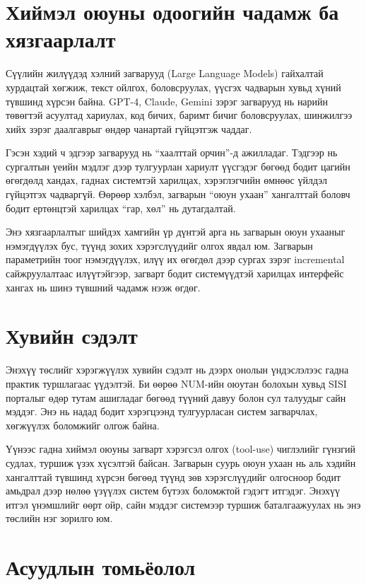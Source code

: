 \section{Хиймэл оюуны одоогийн чадамж ба хязгаарлалт}

Сүүлийн жилүүдэд хэлний загварууд (Large Language Models) гайхалтай хурдацтай хөгжиж, текст ойлгох, боловсруулах, үүсгэх чадварын хувьд хүний түвшинд хүрсэн байна. GPT-4, Claude, Gemini зэрэг загварууд нь нарийн төвөгтэй асуултад хариулах, код бичих, баримт бичиг боловсруулах, шинжилгээ хийх зэрэг даалгаврыг өндөр чанартай гүйцэтгэж чаддаг.

Гэсэн хэдий ч эдгээр загварууд нь ``хаалттай орчин''-д ажилладаг. Тэдгээр нь сургалтын үеийн мэдлэг дээр тулгуурлан хариулт үүсгэдэг бөгөөд бодит цагийн өгөгдөлд хандах, гаднах системтэй харилцах, хэрэглэгчийн өмнөөс үйлдэл гүйцэтгэх чадваргүй. Өөрөөр хэлбэл, загварын ``оюун ухаан'' хангалттай боловч бодит ертөнцтэй харилцах ``гар, хөл'' нь дутагдалтай.

Энэ хязгаарлалтыг шийдэх хамгийн үр дүнтэй арга нь загварын оюун ухааныг нэмэгдүүлэх бус, түүнд зохих хэрэгслүүдийг олгох явдал юм. Загварын параметрийн тоог нэмэгдүүлэх, илүү их өгөгдөл дээр сургах зэрэг incremental сайжруулалтаас илүүтэйгээр, загварт бодит системүүдтэй харилцах интерфейс хангах нь шинэ түвшний чадамж нээж өгдөг.

\section{Хувийн сэдэлт}

Энэхүү төслийг хэрэгжүүлэх хувийн сэдэлт нь дээрх онолын үндэслэлээс гадна практик туршлагаас үүдэлтэй. Би өөрөө NUM-ийн оюутан болохын хувьд SISI порталыг өдөр тутам ашигладаг бөгөөд түүний давуу болон сул талуудыг сайн мэддэг. Энэ нь надад бодит хэрэгцээнд тулгуурласан систем загварчлах, хөгжүүлэх боломжийг олгож байна.

Үүнээс гадна хиймэл оюуны загварт хэрэгсэл олгох (tool-use) чиглэлийг гүнзгий судлах, туршиж үзэх хүсэлтэй байсан. Загварын суурь оюун ухаан нь аль хэдийн хангалттай түвшинд хүрсэн бөгөөд түүнд зөв хэрэгслүүдийг олгосноор бодит амьдрал дээр нөлөө үзүүлэх систем бүтээх боломжтой гэдэгт итгэдэг. Энэхүү итгэл үнэмшлийг өөрт ойр, сайн мэддэг системээр туршиж баталгаажуулах нь энэ төслийн нэг зорилго юм.

\section{Асуудлын томьёолол}

